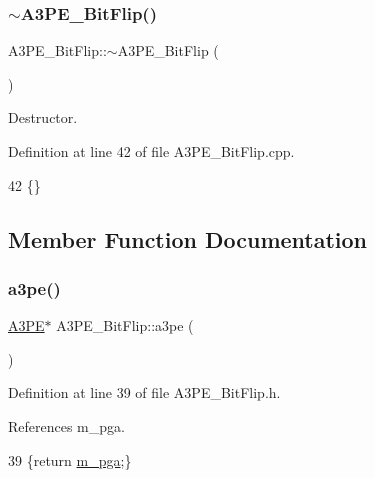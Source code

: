 \subsubsection{\texorpdfstring{$\sim$\+A3\+P\+E\+\_\+\+Bit\+Flip()}{~A3PE\_BitFlip()}}
{\footnotesize\ttfamily A3\+P\+E\+\_\+\+Bit\+Flip\+::$\sim$\+A3\+P\+E\+\_\+\+Bit\+Flip (\begin{DoxyParamCaption}{ }\end{DoxyParamCaption})\hspace{0.3cm}{\ttfamily [virtual]}}



Destructor. 



Definition at line 42 of file A3\+P\+E\+\_\+\+Bit\+Flip.\+cpp.


\begin{DoxyCode}
42 \{\}
\end{DoxyCode}


\subsection{Member Function Documentation}
\mbox{\label{classA3PE__BitFlip_ac0d0747dfdd99084dd5524fea62f11d6}} 
\subsubsection{\texorpdfstring{a3pe()}{a3pe()}}
{\footnotesize\ttfamily \hyperlink{classA3PE}{A3\+PE}$\ast$ A3\+P\+E\+\_\+\+Bit\+Flip\+::a3pe (\begin{DoxyParamCaption}{ }\end{DoxyParamCaption})\hspace{0.3cm}{\ttfamily [inline]}}



Definition at line 39 of file A3\+P\+E\+\_\+\+Bit\+Flip.\+h.



References m\+\_\+pga.


\begin{DoxyCode}
39 \{\textcolor{keywordflow}{return} \hyperlink{classA3PE__BitFlip_ad20d7abccf27fa87b931cb77cd6b5e41}{m\_pga};\}
\end{DoxyCode}
\mbox{\label{classAttrib_a235f773af19c900264a190b00a3b4ad7}} 
